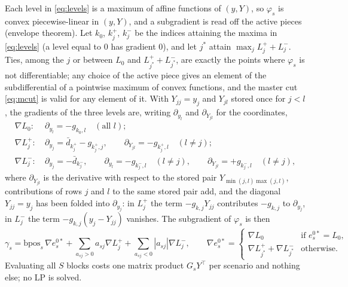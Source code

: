 \documentclass[11pt]{article}
\newcommand{\bpos}{\mathrm{bpos}}
\newcommand{\ad}{\bar d}
\newcommand{\T}{^{\top}}
\begin{document}
Each level in \eqref{eq:levels} is a maximum of affine functions of $(y,Y)$, so $\varphi_s$ is convex
piecewise-linear in $(y,Y)$, and a subgradient is read off the active pieces (envelope theorem). Let $k_0$, $k^+_j$,
$k^-_j$ be the indices attaining the maxima in \eqref{eq:levels} (a level equal to $0$ has gradient $0$), and let
$j^*$ attain $\max_j L^+_j+L^-_j$. Ties, among the $j$ or between $L_0$ and $L^+_{j^*}+L^-_{j^*}$, are exactly the
points where $\varphi_s$ is not differentiable; any choice of the active piece gives an element of the
subdifferential of a pointwise maximum of convex functions, and the master cut \eqref{eq:mcut} is valid for any element
of it. With $Y_{jj} = y_j$ and $Y_{jl}$ stored once for $j<l$, the gradients of the three
levels are, writing $\partial_{y_l}$ and $\partial_{Y_{jl}}$ for the coordinates,
\begin{equation}\label{eq:grad}
\begin{aligned}
\nabla L_0:\ & \partial_{y_l} = -g_{k_0,l}\quad(\text{all } l);\\
\nabla L^+_j:\ & \partial_{y_j} = \ad_{k^+_j} - g_{k^+_j,j},\qquad \partial_{Y_{jl}} = -g_{k^+_j,l}\quad (l\ne j);\\
\nabla L^-_j:\ & \partial_{y_j} = -\ad_{k^-_j},\qquad \partial_{y_l} = -g_{k^-_j,l}\quad (l\ne j),\qquad \partial_{Y_{jl}} = +g_{k^-_j,l}\quad (l\ne j),
\end{aligned}
\end{equation}
where $\partial_{Y_{jl}}$ is the derivative with respect to the stored pair $Y_{\min(j,l)\max(j,l)}$, contributions of
rows $j$ and $l$ to the same stored pair add, and the diagonal $Y_{jj} = y_j$ has been folded into $\partial_{y_j}$:
in $L^+_j$ the term $-g_{k,j}Y_{jj}$ contributes $-g_{k,j}$ to $\partial_{y_j}$, in $L^-_j$ the term
$-g_{k,j}(y_j - Y_{jj})$ vanishes. The subgradient of $\varphi_s$ is then
\begin{equation}\label{eq:subgrad}
\gamma_s = \bpos_s\,\nabla e^{0*}_s + \sum_{a_{sj}>0}a_{sj}\nabla L^+_j + \sum_{a_{sj}<0}|a_{sj}|\nabla L^-_j,\qquad
\nabla e^{0*}_s = \begin{cases}\nabla L_0 & \text{if } e^{0*}_s = L_0,\\ \nabla L^+_{j^*}+\nabla L^-_{j^*} & \text{otherwise.}\end{cases}
\end{equation}
Evaluating all $S$ blocks costs one matrix product $G_s Y\T$ per scenario and nothing else; no LP is solved.
\end{document}
